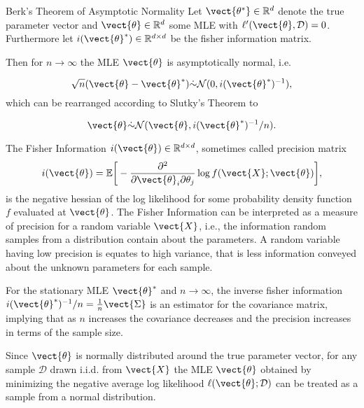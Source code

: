         \begin{threm}{Berk's Theorem of Asymptotic Normality\cite{berk1972consistency}}
            Let $\vect{\theta^*} \in \mathbb{R}^d$ denote the true parameter vector and $\vect{\theta} \in \mathbb{R}^d$ some MLE with $\ell'(\vect{\theta}, \mathcal{D}) = 0$.
            Furthermore let $i(\vect{\theta}^*) \in \mathbb{R}^{d \times d}$ be the fisher information matrix.

            Then for $n \rightarrow \infty$ the MLE $\vect{\theta}$ is asymptotically normal, i.e.

            \begin{equation}
                \sqrt{n}(\vect{\theta} - \vect{\theta}^*) \dot{\sim} \mathcal{N}(0, i(\vect{\theta}^*)^{-1}),
            \end{equation}
            which can be rearranged according to Slutky's Theorem\cite{casella2002statistical} to

            \begin{equation}
                \vect{\theta} \dot{\sim} \mathcal{N}(\vect{\theta}, i(\vect{\theta}^*)^{-1}/n).
            \end{equation}
        \end{threm}

        The Fisher Information $i(\vect{\theta}) \in \mathbb{R}^{d \times d}$, sometimes called precision matrix
        \begin{equation*}
            i(\vect{\theta}) = \mathbb{E}\bigg[- \frac{\partial^2}{\partial \vect{\theta}_i \partial \theta_j} \log f(\vect{X}; \vect{\theta})\bigg] ,
        \end{equation*} 
        is the negative hessian of the log likelihood for some probability density function $f$ evaluated at $\vect{\theta}$.
        The Fisher Information can be interpreted as a measure of precision for a random variable $\vect{X}$, i.e., the information random samples from a distribution contain about the parameters.
        A random variable having low precision is equates to high variance, that is less information conveyed about the unknown parameters for each sample.

        For the stationary MLE $\vect{\theta}^*$  and $n \rightarrow \infty$, the inverse fisher information $i(\vect{\theta}^*)^{-1}/ n = \frac{1}{n} \vect{\Sigma}$ is an estimator for the covariance matrix, implying that as $n$ increases the covariance decreases and the precision increases in terms of the sample size.

        Since $\vect{\theta}$ is normally distributed around the true parameter vector, for any sample $\mathcal{D}$ drawn i.i.d. from $\vect{X}$ the MLE $\vect{\theta}$ obtained by minimizing the negative average log likelihood $\ell(\vect{\theta}; \mathcal{D})$ can be treated as a sample from a normal distribution.

